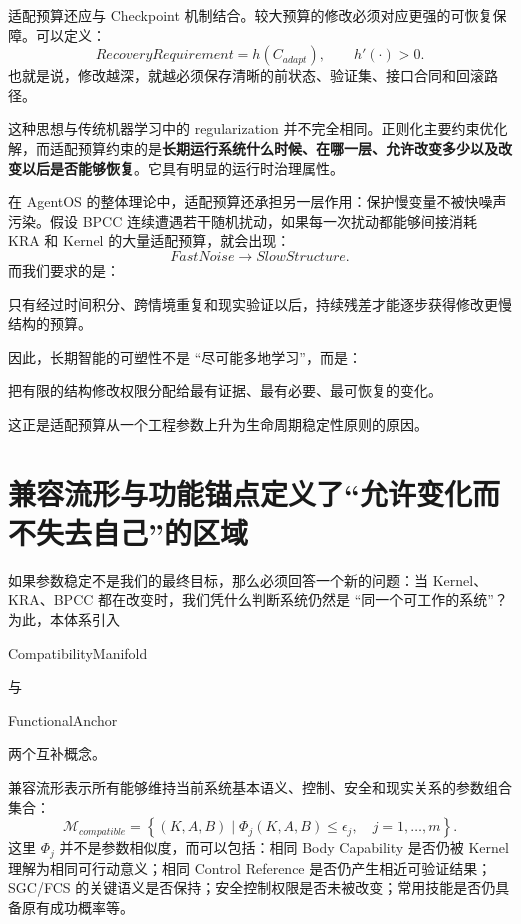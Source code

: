 适配预算还应与 Checkpoint 机制结合。较大预算的修改必须对应更强的可恢复保障。可以定义：
\[
RecoveryRequirement
=
h(C_{adapt}),
\qquad
h'(\cdot)>0.
\]
也就是说，修改越深，就越必须保存清晰的前状态、验证集、接口合同和回滚路径。

这种思想与传统机器学习中的 regularization 并不完全相同。正则化主要约束优化解，而适配预算约束的是\textbf{长期运行系统什么时候、在哪一层、允许改变多少以及改变以后是否能够恢复}。它具有明显的运行时治理属性。

在 AgentOS 的整体理论中，适配预算还承担另一层作用：保护慢变量不被快噪声污染。假设 BPCC 连续遭遇若干随机扰动，如果每一次扰动都能够间接消耗 KRA 和 Kernel 的大量适配预算，就会出现：
\[
FastNoise
\rightarrow
SlowStructure.
\]
而我们要求的是：
\begin{statementbox}
\centering
{}
\end{statementbox}
只有经过时间积分、跨情境重复和现实验证以后，持续残差才能逐步获得修改更慢结构的预算。

因此，长期智能的可塑性不是 ``尽可能多地学习''，而是：
\begin{statementbox}
把有限的结构修改权限分配给最有证据、最有必要、最可恢复的变化。
\end{statementbox}
这正是适配预算从一个工程参数上升为生命周期稳定性原则的原因。

\section{兼容流形与功能锚点定义了“允许变化而不失去自己”的区域}

如果参数稳定不是我们的最终目标，那么必须回答一个新的问题：当 Kernel、KRA、BPCC 都在改变时，我们凭什么判断系统仍然是 ``同一个可工作的系统''？为此，本体系引入
\begin{statementbox}
CompatibilityManifold
\end{statementbox}
与
\begin{statementbox}
FunctionalAnchor
\end{statementbox}
两个互补概念。

兼容流形表示所有能够维持当前系统基本语义、控制、安全和现实关系的参数组合集合：
\[
\mathcal M_{compatible}
=
\left\{
(K,A,B)
\mid
\Phi_j(K,A,B)\leq \epsilon_j,
\quad
j=1,\ldots,m
\right\}.
\]
这里 $\Phi_j$ 并不是参数相似度，而可以包括：相同 Body Capability 是否仍被 Kernel 理解为相同可行动意义；相同 Control Reference 是否仍产生相近可验证结果；SGC/FCS 的关键语义是否保持；安全控制权限是否未被改变；常用技能是否仍具备原有成功概率等。

